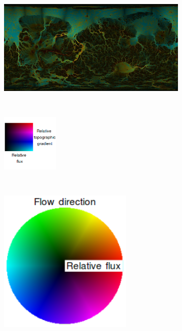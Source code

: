 \documentclass[12pt]{iopart}
\numberwithin{equation}{section}
\begin{document}
\begin{figure}
    \centering
    \begin{subfigure}[b]{1.0\textwidth}
        \includegraphics[width=\textwidth]{GradAndFlow.jpg}
        \caption{}
        \label{fig:GradAndFlow}
    \end{subfigure}

    ~ %
    \begin{subfigure}[b]{0.65\textwidth}
        \includegraphics[width=0.3\textwidth]{GradAndFlowkey.png}
        \label{fig:GradAndFlowkey}
    \end{subfigure}
    ~ %
    \begin{subfigure}[b]{0.25\textwidth}
        \includegraphics[width=0.7\textwidth]{FlowDirectionskey.png}
        \label{fig:FlowDirectionskey}
    \end{subfigure}


\end{figure}
\end{document}
